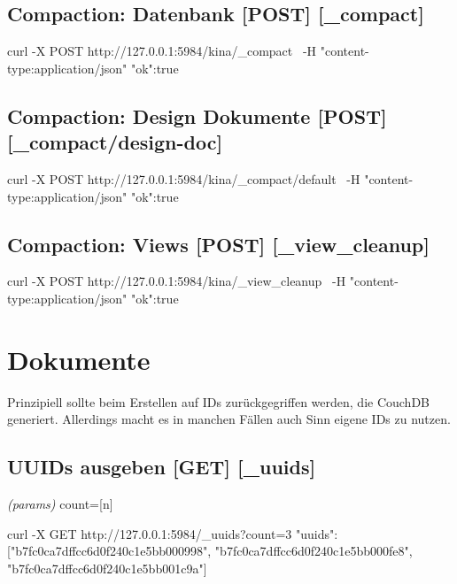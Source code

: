 \documentclass[19pt,landscape,twocolumn]{article}
\newcommand{\htmlverb}[1]{{[}\textbf{{#1}}{]}}
\begin{document}
\subsection{Compaction: Datenbank \htmlverb{POST} \htmlverb{\_compact}}

\begin{code}
curl -X POST http://127.0.0.1:5984/kina/_compact \
  -H "content-type:application/json"
{"ok":true}
\end{code}

\subsection{Compaction: Design Dokumente \htmlverb{POST} \htmlverb{\_compact/design-doc}}

\begin{code}
curl -X POST http://127.0.0.1:5984/kina/_compact/default \
  -H "content-type:application/json"
{"ok":true}
\end{code}

\subsection{Compaction: Views \htmlverb{POST} \htmlverb{\_view\_cleanup}}

\begin{code}
curl -X POST http://127.0.0.1:5984/kina/_view_cleanup \
  -H "content-type:application/json"
{"ok":true}
\end{code}

\section{Dokumente}
Prinzipiell sollte beim Erstellen auf IDs zurückgegriffen werden, die CouchDB 
generiert. Allerdings macht es in manchen Fällen auch Sinn eigene IDs zu nutzen.

\subsection{UUIDs ausgeben \htmlverb{GET} \htmlverb{\_uuids}}
\emph{(params)} count={[}n{]}

\begin{code}
curl -X GET http://127.0.0.1:5984/_uuids?count=3
{"uuids":
  ["b7fc0ca7dffcc6d0f240c1e5bb000998",
   "b7fc0ca7dffcc6d0f240c1e5bb000fe8",
   "b7fc0ca7dffcc6d0f240c1e5bb001c9a"]
}
\end{code}
\end{document}
